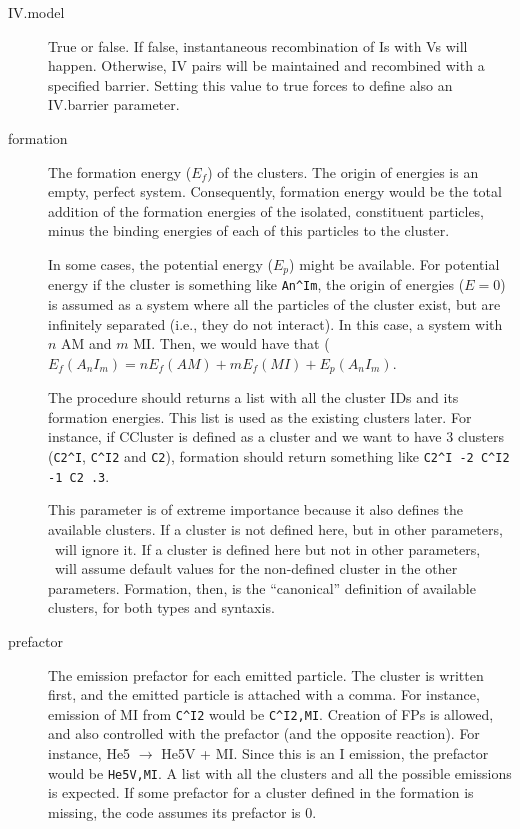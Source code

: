 \begin{description}
\item[IV.model] True or false. If false, instantaneous recombination of Is with Vs will happen. Otherwise, IV pairs will be maintained and recombined with a specified barrier. Setting this value to true forces to define also an IV.barrier parameter.

\item [formation] The formation energy ($E_f$) of the clusters. The origin of energies is an empty, perfect system. Consequently, formation energy would be the total addition of the formation energies of the isolated, constituent particles, minus the binding energies of each of this particles to the cluster. 

In some cases, the potential energy ($E_p$) might be available. For potential energy if the cluster is something like \verb+An^Im+, the origin of energies ($E=0$) is assumed as a system where all the particles of the cluster exist, but are infinitely separated (i.e., they do not interact). In this case, a system with $n$ AM and $m$ MI. Then, we would have that ($E_f(A_nI_m) = nE_f(AM) + mE_f(MI) + E_p(A_nI_m)$.

The procedure should returns a list with all the cluster IDs and its formation energies. This list is used as the existing clusters later. For instance, if CCluster is defined as a cluster and we want to have 3 clusters (\verb+C2^I+, \verb+C^I2+ and \verb+C2+), formation should return something like {\tt \verb+C2^I -2 C^I2 -1 C2 .3+}.

This parameter is of extreme importance because it also defines the available clusters. If a cluster is not defined here, but in other parameters, \MMonCa\ will ignore it. If a cluster is defined here but not in other parameters, \MMonCa\ will assume default values for the non-defined cluster in the other parameters. Formation, then, is the ``canonical'' definition of available clusters, for both types and syntaxis.

\item [prefactor] The emission prefactor for each emitted particle. The cluster is written first, and the emitted particle is attached with a comma. For instance, emission of MI from \verb+C^I2+ would be {\tt \verb+C^I2,MI+}. Creation of FPs is allowed, and also controlled with the prefactor (and the opposite reaction). For instance, He5 $\rightarrow$ He5V + MI. Since this is an I emission, the prefactor would be {\tt He5V,MI}. A list with all the clusters and all the possible emissions is expected. If some prefactor for a cluster defined in the formation is missing, the code assumes its prefactor is 0.


\end{description}
